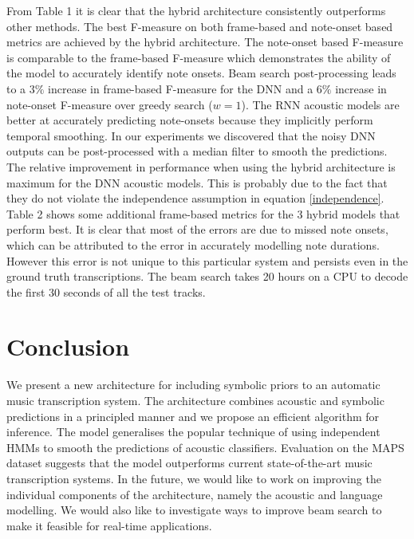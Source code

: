 \documentclass{article}
\begin{document}
From Table 1 it is clear that the hybrid architecture consistently outperforms other methods. The best F-measure on both frame-based and note-onset based metrics are achieved by the hybrid architecture. The note-onset based F-measure is comparable to the frame-based F-measure which demonstrates the ability of the model to accurately identify note onsets. Beam search post-processing leads to a $3\%$ increase in frame-based F-measure for the DNN and a $6\%$ increase in note-onset F-measure over greedy search ($w = 1$). The RNN acoustic models are better at accurately predicting note-onsets because they implicitly perform temporal smoothing. In our experiments we discovered that the noisy DNN outputs can be post-processed with a median filter to smooth the predictions. The relative improvement in performance when using the hybrid architecture is maximum for the DNN acoustic models. This is probably due to the fact that they do not violate the independence assumption in equation \ref{independence}. Table 2 shows some additional frame-based metrics for the 3 hybrid models that perform best. It is clear that most of the errors are due to missed note onsets, which can be attributed to the error in accurately modelling note durations. However this error is not unique to this particular system and persists even in the ground truth transcriptions. The beam search takes 20 hours on a CPU to decode the first 30 seconds of all the test tracks. 

\section{Conclusion}

We present a new architecture for including symbolic priors to an automatic music transcription system. The architecture combines acoustic and symbolic predictions in a principled manner and we propose an efficient algorithm for inference. The model generalises the popular technique of using independent HMMs to smooth the predictions of acoustic classifiers. Evaluation on the MAPS dataset suggests that the model outperforms current state-of-the-art music transcription systems. In the future, we would like to work on improving the individual components of the architecture, namely the acoustic and language modelling. We would also like to investigate ways to improve beam search to make it feasible for real-time applications. 
\end{document}
